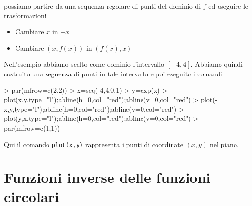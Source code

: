 \documentclass[onecolumn,11pt]{book}
\begin{document}
possiamo partire da una sequenza regolare di punti del dominio  di $f$ ed eseguire le trasformazioni  
\begin{itemize}
\item Cambiare $x$ in $-x$
\item Cambiare $(x,f(x))$ in $(f(x),x)$
\end{itemize}
Nell'esempio abbiamo scelto come dominio l'intervallo $[-4,4]$. Abbiamo quindi costruito una seguenza di punti in tale intervallo e poi eseguito i comandi
\begin{Schunk}
\begin{Sinput}
> par(mfrow=c(2,2))
> x=seq(-4,4,0.1)
> y=exp(x)
> plot(x,y,type="l");abline(h=0,col="red");abline(v=0,col="red")
> plot(-x,y,type="l");abline(h=0,col="red");abline(v=0,col="red")
> plot(y,x,type="l");abline(h=0,col="red");abline(v=0,col="red")
> par(mfrow=c(1,1))
\end{Sinput}
\end{Schunk}
Qui il comando \texttt{plot(x,y)} rappresenta i punti di coordinate $(x,y)$ nel piano.
\section{Funzioni inverse delle funzioni circolari}
\end{document}
